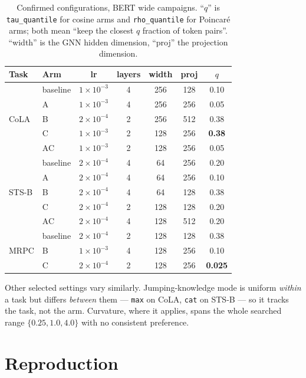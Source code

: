 \documentclass{article}
\begin{document}
\begin{table}[h]
\caption{Confirmed configurations, BERT wide campaigns. ``$q$'' is
\texttt{tau\_quantile} for cosine arms and \texttt{rho\_quantile} for Poincar\'e
arms; both mean ``keep the closest $q$ fraction of token pairs''. ``width'' is
the GNN hidden dimension, ``proj'' the projection dimension.}
\label{tab:hp}
\begin{center}
\small
\begin{tabular}{llccccc}
\toprule
Task & Arm & lr & layers & width & proj & $q$ \\
\midrule
\multirow{5}{*}{CoLA}
 & baseline & $1{\times}10^{-3}$ & 4 & 256 & 128 & 0.10 \\
 & A        & $1{\times}10^{-3}$ & 4 & 256 & 256 & 0.05 \\
 & B        & $2{\times}10^{-4}$ & 2 & 256 & 512 & 0.38 \\
 & C        & $1{\times}10^{-3}$ & 2 & 128 & 256 & \textbf{0.38} \\
 & AC       & $1{\times}10^{-3}$ & 2 & 128 & 256 & 0.05 \\
\midrule
\multirow{5}{*}{STS-B}
 & baseline & $2{\times}10^{-4}$ & 4 & \phantom{0}64 & 256 & 0.20 \\
 & A        & $2{\times}10^{-4}$ & 4 & \phantom{0}64 & 256 & 0.10 \\
 & B        & $2{\times}10^{-4}$ & 4 & \phantom{0}64 & 128 & 0.38 \\
 & C        & $2{\times}10^{-4}$ & 2 & 128 & 128 & 0.20 \\
 & AC       & $2{\times}10^{-4}$ & 4 & 128 & 512 & 0.20 \\
\midrule
\multirow{3}{*}{MRPC}
 & baseline & $2{\times}10^{-4}$ & 2 & 128 & 128 & 0.38 \\
 & B        & $1{\times}10^{-3}$ & 4 & 128 & 256 & 0.10 \\
 & C        & $2{\times}10^{-4}$ & 2 & 128 & 256 & \textbf{0.025} \\
\bottomrule
\end{tabular}
\end{center}
\end{table}

Other selected settings vary similarly. Jumping-knowledge mode is uniform
\emph{within} a task but differs \emph{between} them --- \texttt{max} on CoLA,
\texttt{cat} on STS-B --- so it tracks the task, not the arm. Curvature, where
it applies, spans the whole searched range $\{0.25, 1.0, 4.0\}$ with no
consistent preference.

\section{Reproduction}
\label{app:repro}
\end{document}
